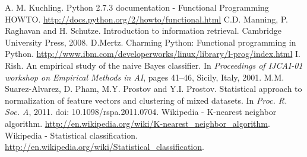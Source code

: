 \documentclass{llncs}
\begin{document}
\begin{thebibliography}{99}
 A. M. Kuchling. Python 2.7.3 documentation - Functional Programming HOWTO. \url{http://docs.python.org/2/howto/functional.html}
 C.D. Manning, P. Raghavan and H. Schutze. Introduction to information retrieval.  Cambridge University Press, 2008. 
 D.Mertz. Charming Python: Functional programming in Python. \url{http://www.ibm.com/developerworks/linux/library/l-prog/index.html}
 I. Rish. An empirical study of the naive Bayes classifier. In \emph{Proceedings of IJCAI-01 workshop on Empirical Methods in AI}, pages 41--46, Sicily, Italy, 2001.
 M.M. Suarez-Alvarez, D. Pham, M.Y. Prostov and Y.I. Prostov. Statistical approach to normalization of feature vectors and clustering of mixed datasets. In \emph{Proc. R. Soc. A}, 2011. doi: 10.1098/rspa.2011.0704. 
 Wikipedia - K-nearest neighbor algorithm. \url{http://en.wikipedia.org/wiki/K-nearest\_neighbor\_algorithm}.
 Wikipedia - Statistical classification. \url{http://en.wikipedia.org/wiki/Statistical\_classification}. 
\end{thebibliography}
\end{document}
